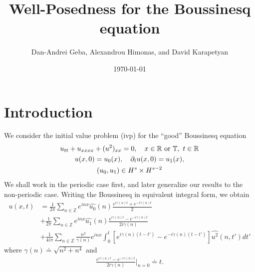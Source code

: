 \documentclass[12pt,reqno]{amsart}
\numberwithin{equation}{section}  %
\newcommand{\rr}{\mathbb{R}}
\newcommand{\zz}{\mathbb{Z}}
\newcommand{\ci}{\mathbb{T}}
\newcommand{\wh}{\widehat}
\newcommand{\p}{\partial}
\begin{document}
\title{Well-Posedness for the Boussinesq equation}
\author{Dan-Andrei Geba, Alexandrou Himonas, and David Karapetyan}
\address{Department of Mathematics, University of Rochester, Rochester, NY 14627}
\address{Department of Mathematics, University of Notre Dame, Notre Dame, IN 46556}
\address{Department of Mathematics, University of Notre Dame, Notre Dame, IN 46556}
\date{\today}
%
%
\maketitle
\tableofcontents
%
%
\section{Introduction}
%
We consider the initial value problem (ivp) for the ``good'' Boussinesq
equation 
\begin{gather}
  u_{tt} + u_{xxxx} + (u^2)_{xx} = 0, \quad x \in \rr \ \text{or} \
  \ci, \ t \in \rr
  \label{eqn:mb-2}
  \\
  u(x,0) = u_{0}(x), \quad \p_t u(x, 0) = u_1(x), 
  \label{eqn:mb-init-data-2}
  \\
  \notag
  (u_0, u_1) \in
  H^{s}\times
  H^{s-2}
\end{gather}
%
%
We shall work in the periodic case first, and later generalize our results to
the non-periodic case. Writing the Boussinesq in equivalent integral form, we obtain 
%
\begin{equation}
  \begin{split}
    u(x,t)
    & = \frac{1}{2\pi}\sum_{n \in \zz} e^{inx} \wh{u_{0}}(n) \frac{e^{i\gamma(n)t} + e^{-i\gamma(n)t}}{2} 
    \\
    & + \frac{1}{2 \pi}\sum_{n \in \zz} e^{inx}
    \wh{u_{1}}(n)\frac{e^{i\gamma(n)t} - e^{-i\gamma(n)t}}{2 i \gamma(n)} 
    \\
    & + \frac{1}{4 i \pi}\sum_{n \in \zz} \frac{n^{2}}{\gamma(n)} e^{inx}
    \int_{0}^{t}[e^{i\gamma(n)(t-t')}-e^{-i\gamma(n)(t-t')}]
    \wh{u^{2}}(n, t') dt'
  \end{split}
  \label{eqn:integral-form}
\end{equation}
%
%
where $\gamma(n) \doteq \sqrt{n^{2} + n^{4}}$ and
%
%
\begin{equation*}
\begin{split}
  \frac{e^{i\gamma(n)t} - e^{-i\gamma(n)t}}{2 i \gamma(n)} \vert_{n=0} \doteq t.
\end{split}
\end{equation*}
\end{document}
